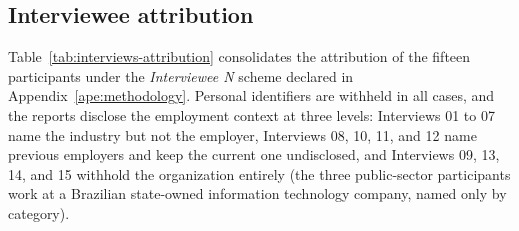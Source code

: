 \subsection*{Interviewee attribution}

Table~\ref{tab:interviews-attribution} consolidates the attribution of the fifteen participants under the \emph{Interviewee N} scheme declared in Appendix~\ref{ape:methodology}. Personal identifiers are withheld in all cases, and the reports disclose the employment context at three levels: Interviews 01 to 07 name the industry but not the employer, Interviews 08, 10, 11, and 12 name previous employers and keep the current one undisclosed, and Interviews 09, 13, 14, and 15 withhold the organization entirely (the three public-sector participants work at a Brazilian state-owned information technology company, named only by category).

